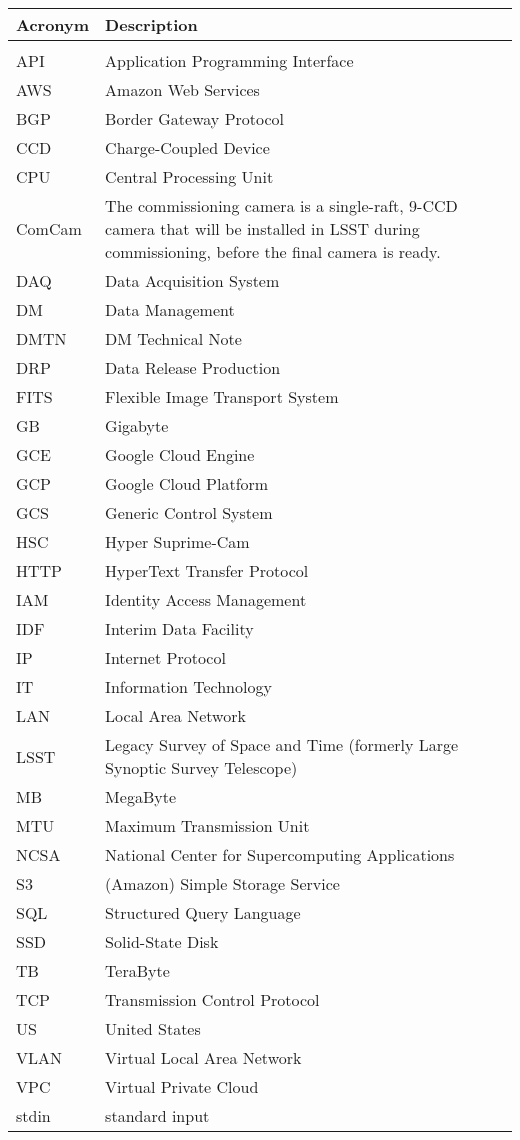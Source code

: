 \addtocounter{table}{-1}
\begin{longtable}{p{}p{}}\hline
\textbf{Acronym} & \textbf{Description}  \\\hline

 &  \\\hline
API & Application Programming Interface \\\hline
AWS & Amazon Web Services \\\hline
BGP &  Border Gateway Protocol \\\hline
CCD & Charge-Coupled Device \\\hline
CPU & Central Processing Unit \\\hline
ComCam & The commissioning camera is a single-raft, 9-CCD camera that will be installed in LSST during commissioning, before the final camera is ready. \\\hline
DAQ & Data Acquisition System \\\hline
DM & Data Management \\\hline
DMTN & DM Technical Note \\\hline
DRP & Data Release Production \\\hline
FITS & Flexible Image Transport System \\\hline
GB & Gigabyte \\\hline
GCE & Google Cloud Engine \\\hline
GCP & Google Cloud Platform \\\hline
GCS & Generic Control System \\\hline
HSC & Hyper Suprime-Cam \\\hline
HTTP & HyperText Transfer Protocol \\\hline
IAM & Identity Access Management \\\hline
IDF & Interim Data Facility \\\hline
IP & Internet Protocol \\\hline
IT & Information Technology \\\hline
LAN & Local Area Network \\\hline
LSST & Legacy Survey of Space and Time (formerly Large Synoptic Survey Telescope) \\\hline
MB & MegaByte \\\hline
MTU & Maximum Transmission Unit \\\hline
NCSA & National Center for Supercomputing Applications \\\hline
S3 & (Amazon) Simple Storage Service  \\\hline
SQL & Structured Query Language \\\hline
SSD & Solid-State Disk \\\hline
TB & TeraByte \\\hline
TCP & Transmission Control Protocol \\\hline
US & United States \\\hline
VLAN &  Virtual Local Area Network \\\hline
VPC &  Virtual Private Cloud \\\hline
stdin & standard input \\\hline
\end{longtable}

